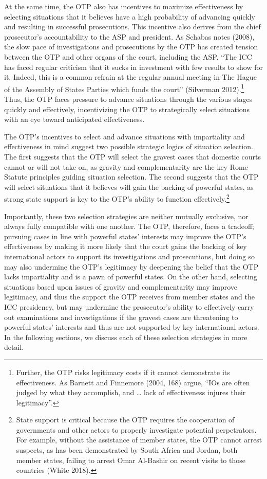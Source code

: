 At the same time, the OTP also has incentives to maximize effectiveness by selecting situations that it believes have a high probability of advancing quickly and resulting in successful prosecutions. This incentive also derives from the chief prosecutor's accountability to the ASP and president. As Schabas notes (2008), the slow pace of investigations and prosecutions by the OTP has created tension between the OTP and other organs of the court, including the ASP. ``The ICC has faced regular criticism that it sucks in investment with few results to show for it. Indeed, this is a common refrain at the regular annual meeting in The Hague of the Assembly of States Parties which funds the court'' (Silverman 2012).\footnote{Further, the OTP risks legitimacy costs if it cannot demonstrate its effectiveness. As Barnett and Finnemore (2004, 168) argue, ``IOs are often judged by what they accomplish, and \ldots{} lack of effectiveness injures their legitimacy''.} Thus, the OTP faces pressure to advance situations through the various stages quickly and effectively, incentivizing the OTP to strategically select situations with an eye toward anticipated effectiveness.

The OTP's incentives to select and advance situations with impartiality and effectiveness in mind suggest two possible strategic logics of situation selection. The first suggests that the OTP will select the gravest cases that domestic courts cannot or will not take on, as gravity and complementarity are the key Rome Statute principles guiding situation selection. The second suggests that the OTP will select situations that it believes will gain the backing of powerful states, as strong state support is key to the OTP's ability to function effectively.\footnote{State support is critical because the OTP requires the cooperation of governments and other actors to properly investigate potential perpetrators. For example, without the assistance of member states, the OTP cannot arrest suspects, as has been demonstrated by South Africa and Jordan, both member states, failing to arrest Omar Al-Bashir on recent visits to those countries (White 2018).}

Importantly, these two selection strategies are neither mutually exclusive, nor always fully compatible with one another. The OTP, therefore, faces a tradeoff; pursuing cases in line with powerful states' interests may improve the OTP's effectiveness by making it more likely that the court gains the backing of key international actors to support its investigations and prosecutions, but doing so may also undermine the OTP's legitimacy by deepening the belief that the OTP lacks impartiality and is a pawn of powerful states. On the other hand, selecting situations based upon issues of gravity and complementarity may improve legitimacy, and thus the support the OTP receives from member states and the ICC presidency, but may undermine the prosecutor's ability to effectively carry out examinations and investigations if the gravest cases are threatening to powerful states' interests and thus are not supported by key international actors. In the following sections, we discuss each of these selection strategies in more detail.

